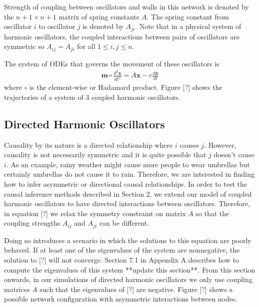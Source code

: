 \documentclass[]{article}
\begin{document}
Strength of coupling between oscillators and walls in this network is denoted by the $n + 1 \times n + 1$ matrix of spring constants $A$. The spring constant from oscillator $i$ to oscillator $j$ is denoted by $A_{ji}$. Note that in a physical system of harmonic oscillators, the coupled interactions between pairs of oscillators are symmetric so $A_{ij} = A_{ji}$ for all $1 \leq i, j \leq n$.

The system of ODEs that governs the movement of these oscillators is
\begin{align*}
\mathbf{m} \circ \frac{d^2\mathbf{x}}{dt^2} = A\mathbf{x} - c\frac{d\mathbf{x}}{dt}
\end{align*}
where $\circ$ is the element-wise or Hadamard product. Figure [?] shows the trajectories of a system of 3 coupled harmonic oscillators.

\subsection{Directed Harmonic Oscillators}
Causality by its nature is a directed relationship where $i$ causes $j$. However, causality is not necessarily symmetric and it is quite possible that $j$ doesn't cause $i$. As an example, rainy weather might cause more people to wear umbrellas but certainly umbrellas do not cause it to rain. Therefore, we are interested in finding how to infer asymmetric or directional causal relationships. In order to test the causal inference methods described in Section 2, we extend our model of coupled harmonic oscillators to have directed interactions between oscillators. Therefore, in equation [?] we relax the symmetry constraint on matrix $A$ so that the coupling strengths $A_{ij}$ and $A_{ji}$ can be different.

Doing so introduces a scenario in which the solutions to this equation are poorly behaved. If at least one of the eigenvalues of the system are nonnegative, the solution to [?] will not converge. Section 7.1 in Appendix A describes how to compute the eigenvalues of this system **update this section**. From this section onwards, in our simulations of directed harmonic oscillators we only use coupling matrices $A$ such that the eigenvalues of [?] are negative.  Figure [?] shows a possible network configuration with asymmetric interactions between nodes.
\end{document}
